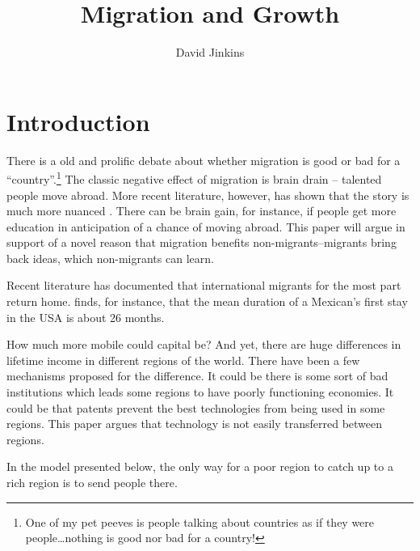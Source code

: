 \documentclass[12pt]{article}
\title{Migration and Growth}
\author{David Jinkins}
\begin{document}
\maketitle

\section{Introduction}

There is a old and prolific debate about whether migration is good or bad for a ``country''.\footnote{One of my pet peeves is people talking about countries as if they were people\dots nothing is good nor bad for a country!}  The classic negative effect of migration is brain drain -- talented people move abroad.  More recent literature, however, has shown that the story is much more nuanced \citep{Beineetal2001}.  There can be brain gain, for instance, if people get more education in anticipation of a chance of moving abroad.  This paper will argue in support of a novel reason that migration benefits non-migrants--migrants bring back ideas, which non-migrants can learn.

Recent literature has documented that international migrants for the most part return home.  \citet{Carrion-Flores2006} finds, for instance, that the mean duration of a Mexican's first stay in the USA is about 26 months.


How much more mobile could capital be? And yet, there are huge differences in lifetime income in different regions of the world.  There have been a few mechanisms proposed for the difference.  It could be there is some sort of bad institutions which leads some regions to have poorly functioning economies.  It could be that patents prevent the best technologies from being used in some regions.  This paper argues that technology is not easily transferred between regions.   

In the model presented below, the only way for a poor region to catch up to a rich region is to send people there.  
\end{document}

